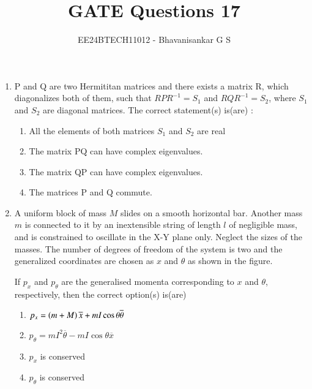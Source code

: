 \documentclass[journal]{IEEEtran}
\begin{document}

\vspace{3cm}

\title{GATE Questions 17}
\author{EE24BTECH11012 - Bhavanisankar G S}
{\let\newpage\relax\maketitle}
\begin{enumerate}
	\item P and Q are two Hermititan matrices and there exists a matrix R, which diagonalizes both of them, such that $RPR^{-1} = S_1$ and $RQR^{-1} = S_2$, where $S_1$ and $S_2$ are diagonal matrices. The correct statement(s) is(are) :
		\begin{enumerate}
			\item All the elements of both matrices $S_1$ and $S_2$ are real
			\item The matrix PQ can have complex eigenvalues.
			\item The matrix QP can have complex eigenvalues.
			\item The matrices P and Q commute.
		\end{enumerate}
	\item A uniform block of mass $M$ slides on a smooth horizontal bar. Another mass $m$ is connected to it by an inextensible string of length $l$ of negligible mass, and is constrained to oscillate in the X-Y plane only. Neglect the sizes of the masses. The number of degrees of freedom of the system is two and the generalized coordinates are chosen as $x$ and $\theta$ as shown in the figure. \\
		\begin{figure}[H]
			\centering
			
			\label{25}
		\end{figure}
		If $p_x$ and $p_{\theta}$ are the generalised momenta corresponding to $x$ and $\theta$, respectively, then the correct option(s) is(are)
		\begin{enumerate}
	\item $p_x = \left(m+M\right) \overline{x} + mI\cos{\theta} \overline{\theta}$
	\item $p_{\theta} = mI^2 \overline{\theta} - mI \cos{\theta} \overline{x}$
	\item $p_x$ is conserved
	\item $p_{\theta}$ is conserved

\end{enumerate}
\end{enumerate}
\end{document}
